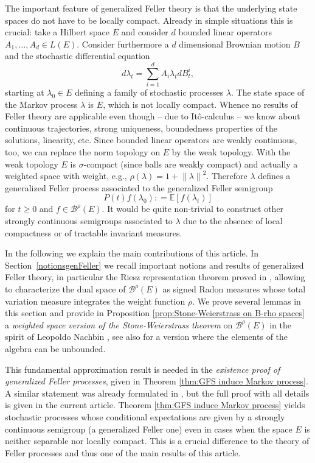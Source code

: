 \documentclass[a4paper,12pt]{article}
\theoremstyle{definition}
\theoremstyle{remark}
\numberwithin{equation}{section}
\numberwithin{theorem}{section}
\begin{document}
The important feature of generalized Feller theory is that the underlying state spaces do not have to be locally compact. Already in simple situations this is  crucial: 
 take a Hilbert space $E$ and consider $d$ bounded linear operators $A_1,\ldots,A_d \in L(E)$. Consider furthermore a $d$ dimensional Brownian motion $B$ and the stochastic differential equation
$$
d \lambda_t = \sum_{i=1}^d A_i \lambda_t dB^i_t,
$$
starting at $\lambda_0 \in E$ defining a family of stochastic processes $\lambda$. The state space of the Markov process $\lambda$ is $E$, which is not locally compact. Whence no results of Feller theory are applicable even though -- due to It\^o-calculus -- we know about continuous trajectories, strong uniqueness, boundedness properties of the solutions, linearity, etc. Since bounded linear operators are weakly continuous, too, we can replace the norm topology on $E$ by the weak topology. With the weak topology $E$ is $\sigma$-compact (since balls are weakly compact) and actually a weighted space with weight, e.g., $\rho(\lambda)=1+ {\|\lambda \|}^2$. Therefore $\lambda$ defines a generalized Feller process associated to the generalized Feller semigroup
$$
P(t)f(\lambda_0) : = \mathbb{E}[f(\lambda_t)]
$$
for $t \geq 0$ and $ f \in \mathcal{\mathscr{B}}^{\rho}(E)$. It would be quite non-trivial to construct other strongly continuous semigroups associated to $\lambda$ due to the absence of local compactness or of tractable invariant measures.

In the following we explain the main contributions of this article.
In Section~\ref{notionsgenFeller} we recall important notions and results of generalized Feller theory, in particular the Riesz representation theorem proved in \cite{DoT}, allowing to characterize the dual space of $\mathcal{\mathscr{B}}^{\rho}(E)$ as signed Radon measures whose total variation measure integrates the weight function $\rho$. We prove several lemmas in this section and  provide in Proposition \ref{prop:Stone-Weierstrass on B-rho spaces} a \emph{weighted space version of the Stone-Weierstrass theorem} on $\mathcal{\mathscr{B}}^{\rho}(E)$ in the spirit of Leopoldo Nachbin \cite{nachbin65}, see also \cite[Theorem 3.6]{CST:23} for a version where the elements of the algebra can be unbounded.

This fundamental approximation result is needed in the \emph{existence proof of generalized Feller processes}, given in  Theorem \ref{thm:GFS induce Markov process}. A similar statement was already formulated in \cite[Theorem 2.11]{CuT}, but the full proof with all details is given in the current article. Theorem \ref{thm:GFS induce Markov process} yields stochastic processes whose conditional expectations are given by a strongly continuous semigroup (a generalized Feller one) even in cases when the space $E$ is neither separable nor locally compact. This is a crucial difference to the theory of Feller processes and thus one of the main results of this article.
\end{document}
